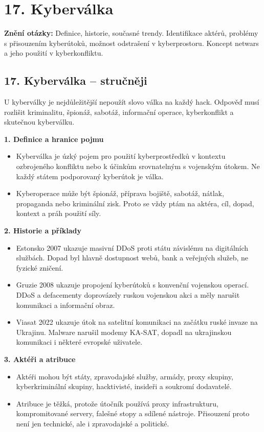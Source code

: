 \documentclass[11pt,a4paper]{article}
\newcommand{\otazka}[3]{\section*{#1}\addcontentsline{toc}{section}{#1}\noindent\textbf{Znění otázky:} #2\par\medskip}
\begin{document}
\newpage

\otazka{17. Kyberválka}{Definice, historie, současné trendy. Identifikace aktérů, problémy s přisouzením kyberútoků, možnost odstrašení v kyberprostoru. Koncept netwars a jeho použití v kyberkonfliktu.}{BSSb1152}

\subsection*{17. Kyberválka -- stručněji}
U kyberválky je nejdůležitější nepoužít slovo válka na každý hack. Odpověď musí rozlišit kriminalitu, špionáž, sabotáž, informační operace, kyberkonflikt a skutečnou kyberválku.

\textbf{1. Definice a hranice pojmu}
\begin{itemize}
  \item Kyberválka je úzký pojem pro použití kyberprostředků v kontextu ozbrojeného konfliktu nebo k účinkům srovnatelným s vojenským útokem. Ne každý státem podporovaný kyberútok je válka.
  \item Kyberoperace může být špionáž, příprava bojiště, sabotáž, nátlak, propaganda nebo kriminální zisk. Proto se vždy ptám na aktéra, cíl, dopad, kontext a práh použití síly.
\end{itemize}

\textbf{2. Historie a příklady}
\begin{itemize}
  \item Estonsko 2007 ukazuje masivní DDoS proti státu závislému na digitálních službách. Dopad byl hlavně dostupnost webů, bank a veřejných služeb, ne fyzické zničení.
  \item Gruzie 2008 ukazuje propojení kyberútoků s konvenční vojenskou operací. DDoS a defacementy doprovázely ruskou vojenskou akci a měly narušit komunikaci a informační obraz.
  \item Viasat 2022 ukazuje útok na satelitní komunikaci na začátku ruské invaze na Ukrajinu. Malware narušil modemy KA-SAT, dopadl na ukrajinskou komunikaci i některé evropské uživatele.
\end{itemize}

\textbf{3. Aktéři a atribuce}
\begin{itemize}
  \item Aktéři mohou být státy, zpravodajské služby, armády, proxy skupiny, kyberkriminální skupiny, hacktivisté, insideři a soukromí dodavatelé.
  \item Atribuce je těžká, protože útočník používá proxy infrastrukturu, kompromitované servery, falešné stopy a sdílené nástroje. Přisouzení proto není jen technické, ale i zpravodajské a politické.
\end{itemize}
\end{document}
